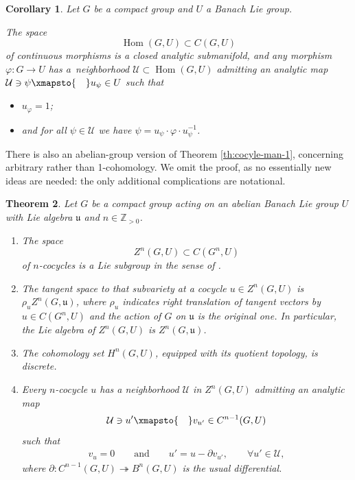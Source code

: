 \documentclass[pdftex]{sigma}
\numberwithin{equation}{section}
\newtheorem{Theorem}{Theorem}[section]
\newtheorem{Corollary}[Theorem]{Corollary}
\newcommand\bZ{{\mathbb Z}}
\newcommand\cU{{\mathcal U}}
\newcommand\fu{{\mathfrak u}}
\DeclareMathOperator{\Hom}{\mathrm{Hom}}
\begin{document}
\begin{Corollary}\label{cor:morsplit}
 Let $G$ be a compact group and $U$ a Banach Lie group.

 The space
 \begin{equation*}
 \Hom(G,U)\subset C(G,U)
 \end{equation*}
 of continuous morphisms is a closed analytic submanifold, and any morphism $\varphi\colon G\to U$ has a~neighborhood $\cU\subset \Hom(G,U)$ admitting an analytic map $\cU\ni \psi\xmapsto{\quad}u_{\psi}\in U$ such that
 \begin{itemize}\itemsep=0pt
 \item $u_{\varphi}=1$;
 \item and for all $\psi\in \cU$ we have $\psi = u_{\psi}\cdot \varphi\cdot u_{\psi}^{-1}$. \qedhere
 \end{itemize}
\end{Corollary}

There is also an abelian-group version of Theorem \ref{th:cocyle-man-1}, concerning arbitrary rather than 1-cohomology. We omit the proof, as no essentially new ideas are needed: the only additional complications are notational.

\begin{Theorem}\label{th:cocyle-man-n}
 Let $G$ be a compact group acting on an abelian Banach Lie group $U$ with Lie algebra $\fu$ and $n\in \bZ_{>0}$.
 \begin{enumerate}[$(1)$]\itemsep=0pt
 \item\label{item:3} The space
 \begin{equation*}
 Z^n(G,U)\subset C(G^n,U)
 \end{equation*}
 of $n$-cocycles is a Lie subgroup in the sense of {\rm\cite[\emph{Section}~III.1.3, \emph{Definition}~3]{bourb-lie-13}}.
 \item\label{item:4} The tangent space to that subvariety at a cocycle ${u}\in Z^n(G,U)$ is $\rho_{u} Z^n(G,\fu)$, where $\rho_{u}$ indicates right translation of tangent vectors by ${u}\in C(G^n,U)$ and the action of $G$ on $\fu$ is the original one.
 In particular, the Lie algebra of $Z^n(G,U)$ is $Z^n(G,\fu)$.
 \item\label{item:5} The cohomology set $H^n(G,U)$, equipped with its quotient topology, is discrete.
 \item\label{item:6} Every $n$-cocycle ${u}$ has a neighborhood $\cU$ in $Z^n(G,U)$ admitting an analytic map
 \begin{equation*}
 \cU\ni {u'}\xmapsto{\quad} v_{u'}\in C^{n-1}(G,U)
 \end{equation*}
 such that
 \begin{align*}
 v_{u} =0\qquad\text{and}\qquad
 u' =u-\partial v_{u'},\qquad \forall u'\in \cU,
 \end{align*}
 where $\partial\colon C^{n-1}(G,U)\twoheadrightarrow B^n(G,U)$ is the usual differential. \qedhere
\end{enumerate}
\end{Theorem}
\end{document}

